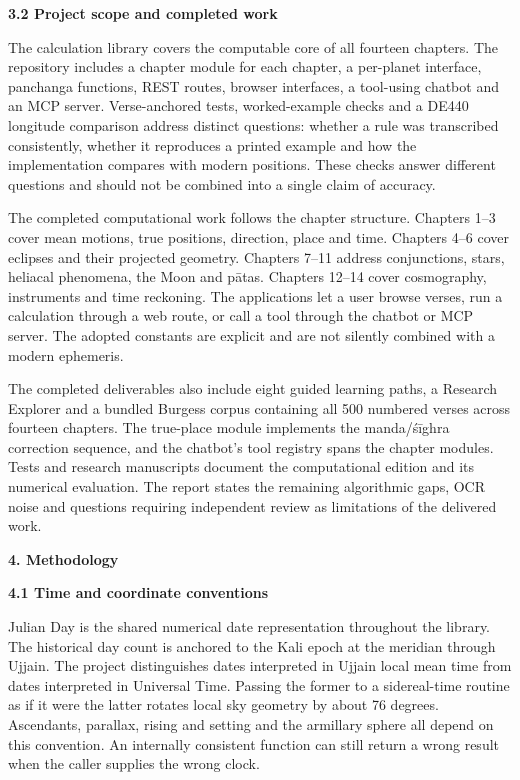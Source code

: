 \documentclass[
]{article}
\begin{document}
\textbf{3.2 Project scope and completed work}

The calculation library covers the computable core of all fourteen
chapters. The repository includes a chapter module for each chapter, a
per-planet interface, panchanga functions, REST routes, browser
interfaces, a tool-using chatbot and an MCP server. Verse-anchored
tests, worked-example checks and a DE440 longitude comparison address
distinct questions: whether a rule was transcribed consistently, whether
it reproduces a printed example and how the implementation compares with
modern positions. These checks answer different questions and should not
be combined into a single claim of accuracy.

The completed computational work follows the chapter structure. Chapters
1--3 cover mean motions, true positions, direction, place and time.
Chapters 4--6 cover eclipses and their projected geometry. Chapters
7--11 address conjunctions, stars, heliacal phenomena, the Moon and
pātas. Chapters 12--14 cover cosmography, instruments and time
reckoning. The applications let a user browse verses, run a calculation
through a web route, or call a tool through the chatbot or MCP server.
The adopted constants are explicit and are not silently combined with a
modern ephemeris.

The completed deliverables also include eight guided learning paths, a
Research Explorer and a bundled Burgess corpus containing all 500
numbered verses across fourteen chapters. The true-place module
implements the manda/śīghra correction sequence, and the chatbot's tool
registry spans the chapter modules. Tests and research manuscripts
document the computational edition and its numerical evaluation. The
report states the remaining algorithmic gaps, OCR noise and questions
requiring independent review as limitations of the delivered work.

\textbf{4. Methodology}

\textbf{4.1 Time and coordinate conventions}

Julian Day is the shared numerical date representation throughout the
library. The historical day count is anchored to the Kali epoch at the
meridian through Ujjain. The project distinguishes dates interpreted in
Ujjain local mean time from dates interpreted in Universal Time. Passing
the former to a sidereal-time routine as if it were the latter rotates
local sky geometry by about 76 degrees. Ascendants, parallax, rising and
setting and the armillary sphere all depend on this convention. An
internally consistent function can still return a wrong result when the
caller supplies the wrong clock.
\end{document}
